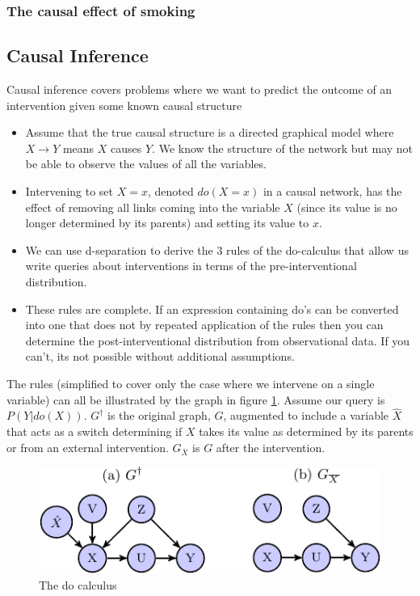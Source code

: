 \documentclass{article}
\begin{document}
\subsubsection*{The causal effect of smoking}







 





\subsection*{Causal Inference}
Causal inference covers problems where we want to predict the outcome of an intervention given some known causal structure
\begin{itemize}
\item Assume that the true causal structure is a directed graphical model where $X \rightarrow Y$ means $X$ causes $Y$. We know the structure of the network but may not be able to observe the values of all the variables.
\item Intervening to set $X = x$, denoted $do(X=x)$ in a causal network, has the effect of removing all links coming into the variable $X$ (since its value is no longer determined by its parents) and setting its value to $x$.
\item We can use d-separation to derive the 3 rules of the do-calculus that allow us write queries about interventions in terms of the pre-interventional distribution. 
\item These rules are complete.  If an expression containing do's can be converted into one that does not by repeated application of the rules then you can determine the post-interventional distribution from observational data. If you can't, its not possible without additional assumptions.
\end{itemize}
The rules (simplified to cover only the case where we intervene on a single variable) can all be illustrated by the graph in figure \ref{fig:dorules}. Assume our query is $P(Y|do(X))$. $G^{\dagger}$ is the original graph, $G$, augmented to include a variable $\hat{X}$  that acts as a switch determining if $X$ takes its value as determined by its parents or from an external intervention. $G_{\overline{X}}$ is $G$ after the intervention. 

\begin{figure}[h]
\caption{The do calculus}
\label{fig:dorules}
\centering
\includegraphics[scale=0.9]{do_rules_figure-crop}
\end{figure}
\end{document}
